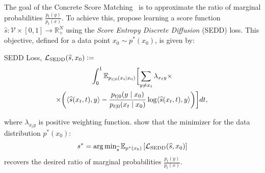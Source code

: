   The goal of the Concrete Score Matching~\citep{meng2022concrete, lou2024discrete} is to approximate the ratio of marginal probabilities $\frac{p_t(y)}{p_t(x)}$. To achieve this, \citep{lou2024discrete} propose learning a score function $\widehat{s} \colon \mathcal{V} \times [0, 1] \to \mathbb{R}_{+}^N$ using the \textit{Score Entropy Discrete Diffusion} (SEDD) loss. This objective, defined for a data point $x_0 \sim p^*(x_0)$, is given by:
  \begin{Box1}{SEDD Loss, $\mathcal{L}_{\text{SEDD}}(\widehat{s}, x_0) \vcentcolon=$}
    \vspace{-8pt}
    \begin{gather}
    \label{eq:sedd loss}
       \int_0^1 \mathbb{E}_{p_{t|0}(x_t|x_0)} \biggl[\sum_{y \neq x_t} \lambda_{x_ty} \times 
       \\
        \! \times \biggl(\langle \widehat{s}(x_t,t), y\rangle - \frac{p_{t \mid 0}(y \mid x_0)}{p_{t \mid 0}(x_t \mid x_0)} \log  \langle \widehat{s}(x_t, t), y\rangle \biggr)\biggr]dt,
       \nonumber 
    \end{gather}
  \end{Box1}
  where $\lambda_{x_ty}$ is positive weighting function.
  \citet{lou2024discrete} show that the minimizer for the data distribution $p^*(x_0)$: 
  \[
    s^*= \arg\min\nolimits_{\widehat{s}} \mathbb{E}_{p^*(x_0)}\left[\mathcal{L}_{\text{SEDD}}(\widehat{s}, x_0)\right]
  \] 
  recovers the desired ratio of marginal probabilities $\frac{p_t(y)}{p_t(x)}.$ 
  
